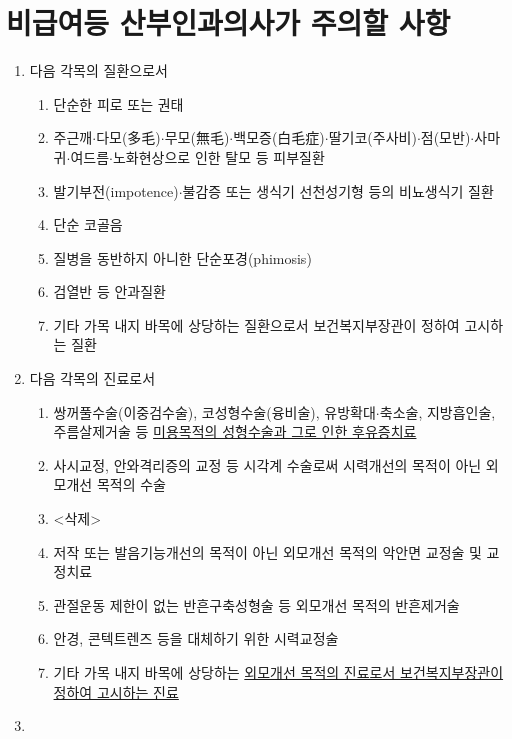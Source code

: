 \section{비급여등 산부인과의사가 주의할 사항}
\begin{enumerate}[1.]\tightlist
\item 다음 각목의 질환으로서 
	\begin{enumerate}[가.]\tightlist
	\item 단순한 피로 또는 권태
	\item 주근깨$\cdot$다모(多毛)$\cdot$무모(無毛)$\cdot$백모증(白毛症)$\cdot$딸기코(주사비)$\cdot$점(모반)$\cdot$사마귀$\cdot$여드름$\cdot$노화현상으로 인한 탈모 등 피부질환
	\item 발기부전(impotence)$\cdot$불감증 또는 생식기 선천성기형 등의 비뇨생식기 질환
	\item 단순 코골음
	\item 질병을 동반하지 아니한 단순포경(phimosis)
	\item 검열반 등 안과질환
	\item 기타 가목 내지 바목에 상당하는 질환으로서 보건복지부장관이 정하여 고시하는 질환
	\end{enumerate}
\item 다음 각목의 진료로서 
	\begin{enumerate}[가.]\tightlist
	\item 쌍꺼풀수술(이중검수술), 코성형수술(융비술), 유방확대$\cdot$축소술, 지방흡인술, 주름살제거술 등 \uline{미용목적의 성형수술과 그로 인한 후유증치료}
	\item 사시교정, 안와격리증의 교정 등 시각계 수술로써 시력개선의 목적이 아닌 외모개선 목적의 수술
	\item <삭제>
	\item 저작 또는 발음기능개선의 목적이 아닌 외모개선 목적의 악안면 교정술 및 교정치료
	\item 관절운동 제한이 없는 반흔구축성형술 등 외모개선 목적의 반흔제거술
	\item 안경, 콘텍트렌즈 등을 대체하기 위한 시력교정술
	\item 기타 가목 내지 바목에 상당하는 \uline{외모개선 목적의 진료로서 보건복지부장관이 정하여 고시하는 진료}
	\end{enumerate}
\item {}

\end{enumerate}
